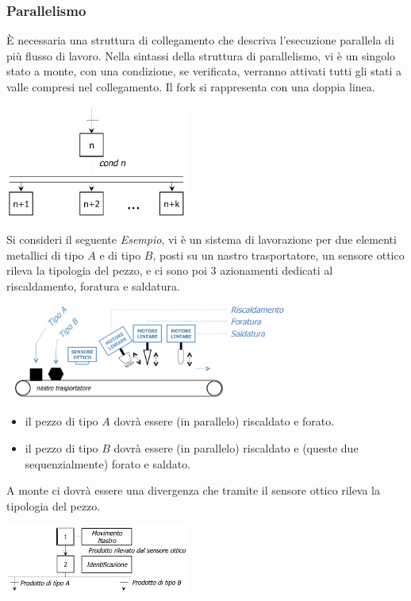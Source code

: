 \documentclass[10pt, letterpaper]{report}
\begin{document}
\subsubsection{Parallelismo}
È necessaria una struttura di collegamento che descriva l'esecuzione parallela di più flusso di lavoro. Nella sintassi della struttura di parallelismo, vi è un singolo stato a monte, con una condizione, se verificata, verranno attivati tutti gli stati a valle compresi nel collegamento. Il fork si rappresenta con una doppia linea.
\begin{center}
    \includegraphics[width=0.45\textwidth ]{images/parallelismo.png}
\end{center}
Si consideri il seguente \textit{Esempio}, vi è un sistema di lavorazione per due elementi metallici di tipo $A$ e di tipo $B$, posti su un nastro trasportatore, un sensore ottico rileva la tipologia del pezzo, e ci sono poi 3 azionamenti dedicati al riscaldamento, foratura e saldatura.
\begin{center}
    \includegraphics[width=0.7\textwidth ]{images/esempioPezzi.png}
\end{center}
\begin{itemize}
    \item il pezzo di tipo $A$ dovrà essere (in parallelo) riscaldato e forato. 
    \item il pezzo di tipo $B$ dovrà essere (in parallelo) riscaldato e (queste due sequenzialmente) forato e saldato.
\end{itemize}
A monte ci dovrà essere una divergenza che tramite il sensore ottico rileva la tipologia del pezzo.
\begin{center}
    \includegraphics[width=0.45\textwidth ]{images/esempioPezzi2.png}
\end{center}
\end{document}
